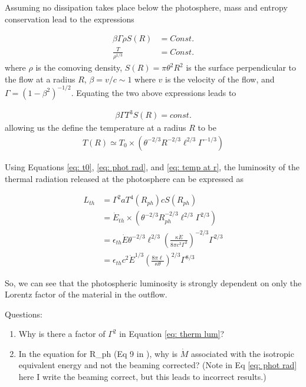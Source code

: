 \documentclass[linenumbers,twocolumn]{aastex631}
\begin{document}
Assuming no dissipation takes place below the photosphere, mass and entropy conservation lead to the expressions 

\begin{align}
	\beta \Gamma \rho S(R) & = Const.\\
	\frac{T}{\rho^{1/3}} &= Const.
\end{align}
where $\rho$ is the comoving density, $S(R) = \pi \theta^2 R^2$ is the surface perpendicular to the flow at a radius $R$, $\beta = v/c\sim 1$ where $v$ is the velocity of the flow, and $\Gamma = (1-\beta^2)^{-1/2}$. Equating the two above expressions leads to 

\begin{align}
	\beta \Gamma T^3 S(R) = const. 
\end{align}
allowing us the define the temperature at a radius $R$ to be 
\begin{align}
	T(R) \simeq T_0 \times (\theta^{-2/3} R^{-2/3} \ell^{2/3} \Gamma^{-1/3}) \label{eq: temp at r}
\end{align}

Using Equations \ref{eq: t0}, \ref{eq: phot rad}, and \ref{eq: temp at r}, the luminosity of the thermal radiation released at the photosphere can be expressed as 

\begin{align}
	L_{th} &= \Gamma^2 a T^4(R_{ph}) c S(R_{ph}) \label{eq: therm lum} \nonumber\\
	&= \dot{E}_{th} \times (\theta^{-2/3} R_{ph}^{-2/3} \ell^{2/3} \Gamma^{2/3}) \nonumber\\
	&= \epsilon_{th}\dot{E} \theta^{-2/3} \ell^{2/3} \left( \frac{\kappa \dot{E}}{8\pi c^3 \Gamma^3} \right)^{-2/3}\Gamma^{2/3} \nonumber\\
	&= \epsilon_{th}c^2\dot{E}^{1/3}\left(\frac{8\pi\ell}{\kappa\theta}\right)^{2/3} \Gamma^{8/3}
\end{align}

So, we can see that the photospheric luminosity is strongly dependent on only the Lorentz factor of the material in the outflow. 

Questions:
\begin{enumerate}
\item Why is there a factor of $\Gamma^2$ in Equation \ref{eq: therm lum}?
\item In the equation for R_ph (Eq 9 in \citealt{2013A&A...551A.124H}), why is $\dot{M}$ associated with the isotropic equivalent energy and not the beaming corrected? (Note in Eq \ref{eq: phot rad} here I write the beaming correct, but this leads to incorrect results.)
\end{enumerate}

\newpage 


\end{document}
